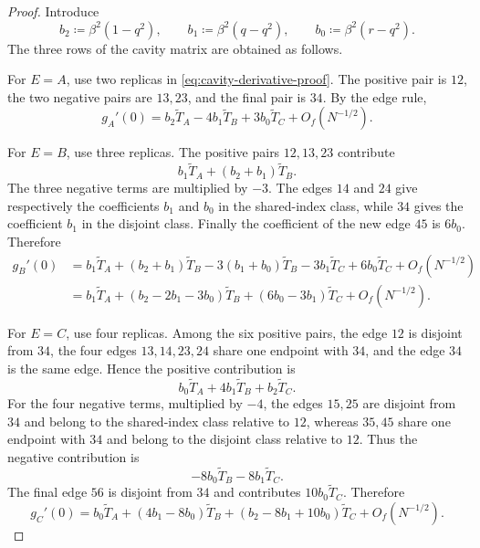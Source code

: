 \begin{proof}
Introduce
\[
 b_2\coloneqq\beta^2(1-q^2),
 \qquad
 b_1\coloneqq\beta^2(q-q^2),
 \qquad
 b_0\coloneqq\beta^2(r-q^2).
\]
The three rows of the cavity matrix are obtained as follows.

For $E=A$, use two replicas in
\eqref{eq:cavity-derivative-proof}.  The positive pair is $12$, the two
negative pairs are $13,23$, and the final pair is $34$.  By the edge rule,
\[
 g_A'(0)
 =
 b_2\widetilde T_A
 -4b_1\widetilde T_B
 +3b_0\widetilde T_C
 +O_f(N^{-1/2}).
 \label{eq:clt-row-A}
\]

For $E=B$, use three replicas.  The positive pairs $12,13,23$ contribute
\[
 b_1\widetilde T_A+(b_2+b_1)\widetilde T_B.
\]
The three negative terms are multiplied by $-3$.  The edges $14$ and $24$
give respectively the coefficients $b_1$ and $b_0$ in the shared-index
class, while $34$ gives the coefficient $b_1$ in the disjoint class.
Finally the coefficient of the new edge $45$ is $6b_0$.  Therefore
\begin{align}
 g_B'(0)
 &=
 b_1\widetilde T_A
 +(b_2+b_1)\widetilde T_B
 -3(b_1+b_0)\widetilde T_B
 -3b_1\widetilde T_C
 +6b_0\widetilde T_C
 +O_f(N^{-1/2})
 \nonumber\\
 &=
 b_1\widetilde T_A
 +(b_2-2b_1-3b_0)\widetilde T_B
 +(6b_0-3b_1)\widetilde T_C
 +O_f(N^{-1/2}).
 \label{eq:clt-row-B}
\end{align}

For $E=C$, use four replicas.  Among the six positive pairs, the edge $12$
is disjoint from $34$, the four edges $13,14,23,24$ share one endpoint with
$34$, and the edge $34$ is the same edge.  Hence the positive contribution is
\[
 b_0\widetilde T_A
 +4b_1\widetilde T_B
 +b_2\widetilde T_C.
\]
For the four negative terms, multiplied by $-4$, the edges $15,25$ are
disjoint from $34$ and belong to the shared-index class relative to $12$,
whereas $35,45$ share one endpoint with $34$ and belong to the disjoint
class relative to $12$.  Thus the negative contribution is
\[
 -8b_0\widetilde T_B-8b_1\widetilde T_C.
\]
The final edge $56$ is disjoint from $34$ and contributes
$10b_0\widetilde T_C$.  Therefore
\begin{equation}
 g_C'(0)
 =
 b_0\widetilde T_A
 +(4b_1-8b_0)\widetilde T_B
 +(b_2-8b_1+10b_0)\widetilde T_C
 +O_f(N^{-1/2}).
 \label{eq:clt-row-C}
\end{equation}


\end{proof}
